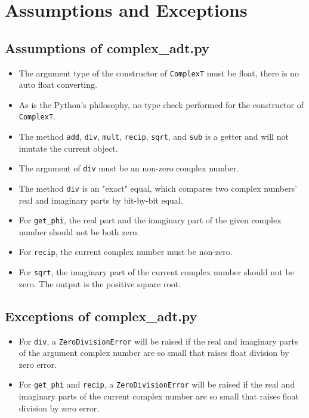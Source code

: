 \documentclass[12pt]{article}
\begin{document}
\section{Assumptions and Exceptions} \label{AssumptAndExcept}
\subsection{Assumptions of complex\_adt.py}
\begin{itemize}
\item The argument type of the constructor of \verb|ComplexT| must be float, there is no auto float converting.
\item As is the Python's philosophy, no type check performed for the constructor of \verb|ComplexT|.
\item The method \verb|add|, \verb|div|, \verb|mult|, \verb|recip|, \verb|sqrt|, and \verb|sub| is a getter and will not imutate the current object.
\item The argument of \verb|div| must be an non-zero complex number.
\item The method \verb|div| is an "exact" equal, which compares two complex numbers' real and imaginary parts by bit-by-bit equal.
\item For \verb|get_phi|, the real part and the imaginary part of the given complex number should not be both zero.
\item For \verb|recip|, the current complex number must be non-zero.
\item For \verb|sqrt|, the imaginary part of the current complex number should not be zero. The output is the positive square root.
\end{itemize}
\subsection{Exceptions of complex\_adt.py}
\begin{itemize}
\item For \verb|div|, a \verb|ZeroDivisionError| will be raised if the real and imaginary parts of the argument complex number are so small that raises float division by zero error.
\item For \verb|get_phi| and \verb|recip|, a \verb|ZeroDivisionError| will be raised if the real and imaginary parts of the current complex number are so small that raises float division by zero error.
\end{itemize}
\end{document}
